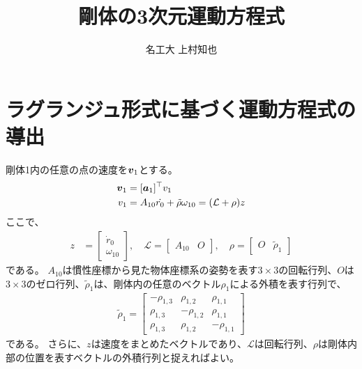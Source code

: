\documentclass[a4j,10pt]{jsarticle}
\def\vctr#1{\mbox{\boldmath $#1$}}
\begin{document}
\title{剛体の3次元運動方程式}
\author{名工大 上村知也}
\setlength{\baselineskip}{4.4mm}	%
\maketitle
\section{ラグランジュ形式に基づく運動方程式の導出}
剛体1内の任意の点の速度を$\vctr{v}_1$とする。
\begin{align}
    \vctr{v}_1 &= [\vctr{a}_1]^\top v_1\\
    v_1 &= A_{10}\dot{r_0}+\tilde{\rho}\omega_{10}= (\mathcal{L}+\rho)z
\end{align}
ここで、
\begin{align*}
    z &= \begin{bmatrix}
        \dot{r}_0\\
        \omega_{10}
    \end{bmatrix},
    \quad
    \mathcal{L} = \begin{bmatrix}
        A_{10} & O
    \end{bmatrix},
    \quad
    \rho = \begin{bmatrix}
        O & \tilde{\rho}_1
    \end{bmatrix}
\end{align*}
である。
$A_{10}$は慣性座標から見た物体座標系の姿勢を表す$3 \times 3$の回転行列、$O$は$3 \times 3$のゼロ行列、$\tilde{\rho}_{1}$は、剛体内の任意のベクトル$\rho_1$による外積を表す行列で、
\begin{align*}
    \tilde{\rho}_1 = \begin{bmatrix}
        -\rho_{1,3} & \rho_{1,2} & \rho_{1,1}\\
        \rho_{1,3} & -\rho_{1,2} & \rho_{1,1}\\
        \rho_{1,3} & \rho_{1,2} & -\rho_{1,1}
    \end{bmatrix}
\end{align*}
である。
さらに、$z$は速度をまとめたベクトルであり、$\mathcal{L}$は回転行列、$\rho$は剛体内部の位置を表すベクトルの外積行列と捉えればよい。
\end{document}
